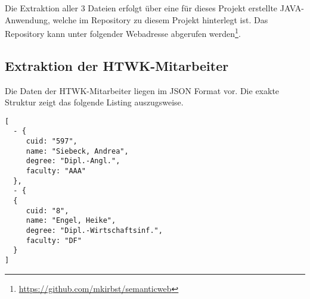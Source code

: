 \documentclass[parskip]{scrartcl}
\begin{document}
Die Extraktion aller 3 Dateien erfolgt über eine für dieses Projekt erstellte JAVA-Anwendung, welche im Repository zu diesem Projekt hinterlegt ist. Das Repository kann unter folgender Webadresse abgerufen werden\footnote{\url{https://github.com/mkirbst/semanticweb}}.

\subsection{Extraktion der HTWK-Mitarbeiter}
Die Daten der HTWK-Mitarbeiter liegen im JSON Format vor. Die exakte Struktur zeigt das folgende Listing auszugsweise. 

\begin{lstlisting}[captionpos=b, caption=Format der importierten HTWK-Mitarbeiterdaten, label=Format der importierten HTWK-Mitarbeiterdaten]
[
  - {
     cuid: "597",
     name: "Siebeck, Andrea",
     degree: "Dipl.-Angl.",
     faculty: "AAA"
  },
  - {
  {
     cuid: "8",
     name: "Engel, Heike",
     degree: "Dipl.-Wirtschaftsinf.",
     faculty: "DF"
  }
]
\end{lstlisting}
\end{document}
